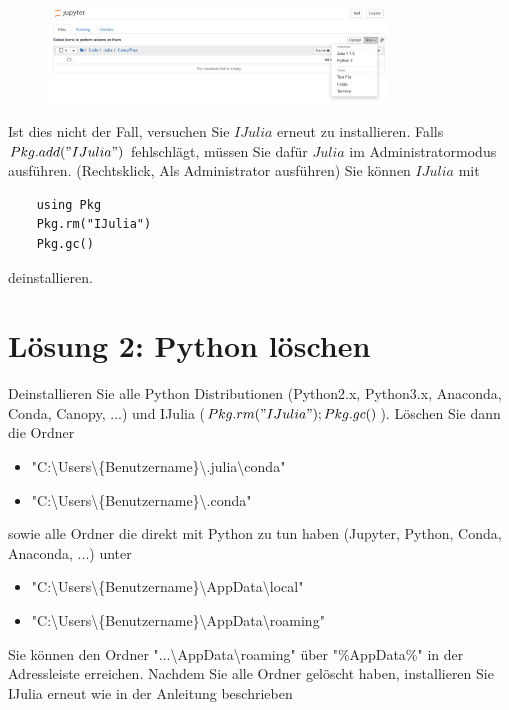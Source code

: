 \documentclass[11pt, a4paper]{scrartcl}
\begin{document}
\begin{figure}[h!]
	\centering
	\includegraphics[width=0.8\textwidth]{img/notebook.png}
\end{figure}

Ist dies nicht der Fall, versuchen Sie $IJulia$ erneut zu installieren. Falls $Pkg.add("IJulia")$ fehlschlägt, müssen Sie dafür $Julia$ im Administratormodus ausführen. (Rechtsklick, Als Administrator ausführen) Sie können $IJulia$ mit 
\begin{lstlisting}
	using Pkg
	Pkg.rm("IJulia")
	Pkg.gc()
\end{lstlisting}
deinstallieren.\textbf{}


\newpage
\section{Lösung 2: Python löschen}


Deinstallieren Sie alle Python Distributionen (Python2.x, Python3.x, Anaconda, Conda, Canopy, ...) und IJulia ($Pkg.rm("IJulia"); Pkg.gc()$). Löschen Sie dann die Ordner
\begin{itemize}
	\item "C:\textbackslash Users\textbackslash \{Benutzername\}\textbackslash .julia\textbackslash conda"
	\item "C:\textbackslash Users\textbackslash \{Benutzername\}\textbackslash .conda"
\end{itemize}
sowie alle Ordner die direkt mit Python zu tun haben (Jupyter, Python, Conda, Anaconda, ...) unter 
\begin{itemize}
	\item "C:\textbackslash Users\textbackslash \{Benutzername\}\textbackslash AppData\textbackslash local"
	\item "C:\textbackslash Users\textbackslash \{Benutzername\}\textbackslash AppData\textbackslash roaming"
\end{itemize}
Sie können den Ordner "...\textbackslash AppData\textbackslash roaming" über "\%AppData\%" in der Adressleiste erreichen. Nachdem Sie alle Ordner gelöscht haben, installieren Sie IJulia erneut wie in der Anleitung beschrieben
\end{document}
